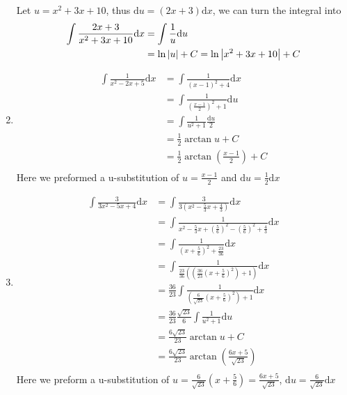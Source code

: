 \documentclass{article}
\numberwithin{equation}{section}
\begin{document}
\begin{enumerate}
    Let $u = x^2 + 3x + 10$, thus $\mathrm{d}u = (2x+3)\mathrm{d}x$, we can turn the integral into
    \begin{align*}
        \int \frac{2x+3}{x^2 + 3x + 10}\mathrm{d}x &= \int \frac{1}{u}\mathrm{d}u\\
        &= \ln \abs{u} + C = \ln \abs{x^2+3x+10}+C
    \end{align*}
    \item \begin{align*}
        \int \frac{1}{x^2-2x+5}\mathrm{d}x &= \int \frac{1}{(x-1)^2 + 4}\mathrm{d}x\\
        &= \int \frac{1}{\left(\frac{x-1}{2}\right)^2+1} \mathrm{d}u\\
        &= \int \frac{1}{u^2 + 1}\frac{\mathrm{d}u}{2}\\
        &=\frac{1}{2}\arctan u + C \\
        &= \frac{1}{2}\arctan \left(\frac{x-1}{2}\right) + C\\
    \end{align*}
    Here we preformed a u-substitution of $u = \frac{x-1}{2}$ and $\mathrm{d}u = \frac{1}{2}\mathrm{d}x$
    \item \begin{align*}
        \int \frac{3}{3x^2-5x+4}\mathrm{d}x &= \int \frac{3}{3(x^2-\frac{5}{3}x+\frac{4}{3})}\mathrm{d}x\\
        &= \int \frac{1}{x^2 - \frac{5}{3}x + \left(\frac{5}{6}\right)^2 - \left(\frac{5}{6}\right)^2 + \frac{4}{3}}\mathrm{d}x\\
        &= \int \frac{1}{\left(x+\frac{5}{6}\right)^2 + \frac{23}{36}}\mathrm{d}x\\
        &=\int \frac{1}{\frac{23}{36}\left(\left(\frac{36}{23}\left(x+\frac{5}{6}\right)^2\right)+1\right)}\mathrm{d}x\\
        &= \frac{36}{23} \int \frac{1}{\left(\frac{6}{\sqrt{23}}\left(x+\frac{5}{6}\right)^2\right)+1}\mathrm{d}x\\
        &=\frac{36}{23}\frac{\sqrt{23}}{6}\int\frac{1}{u^2+1}\mathrm{d}u\\
        &= \frac{6\sqrt{23}}{23}\arctan u + C\\
        &= \frac{6\sqrt{23}}{23}\arctan \left(\frac{6x+5}{\sqrt{23}}\right)\\
    \end{align*}
    Here we preform a u-substitution of $\displaystyle u = \frac{6}{\sqrt{23}}\left(x+\frac{5}{6}\right) = \frac{6x+5}{\sqrt{23}}$, $\displaystyle\mathrm{d}u = \frac{6}{\sqrt{23}}\mathrm{d}x$
\end{enumerate}
\end{document}
